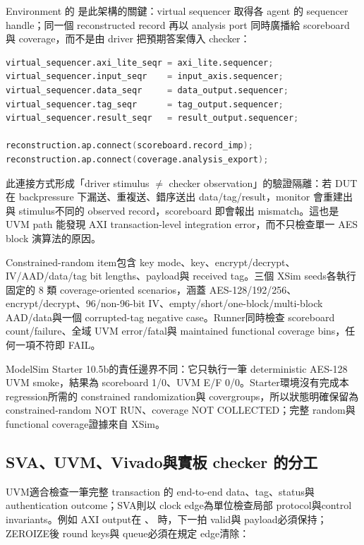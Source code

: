 \documentclass[UTF8,fontset=none,11pt,a4paper]{ctexrep}
\newcommand{\code}[1]{\texttt{\detokenize{#1}}}
\begin{document}
\newpage
Environment 的 \code{connect\_phase} 是此架構的關鍵：virtual sequencer 取得各 agent 的 sequencer handle；同一個 reconstructed record 再以 analysis port 同時廣播給 scoreboard 與 coverage，而不是由 driver 把預期答案傳入 checker：

\begin{lstlisting}[language=Verilog]
virtual_sequencer.axi_lite_seqr = axi_lite.sequencer;
virtual_sequencer.input_seqr    = input_axis.sequencer;
virtual_sequencer.data_seqr     = data_output.sequencer;
virtual_sequencer.tag_seqr      = tag_output.sequencer;
virtual_sequencer.result_seqr   = result_output.sequencer;

reconstruction.ap.connect(scoreboard.record_imp);
reconstruction.ap.connect(coverage.analysis_export);
\end{lstlisting}

此連接方式形成「driver stimulus $\neq$ checker observation」的驗證隔離：若 DUT 在 backpressure 下漏送、重複送、錯序送出 data/tag/result，monitor 會重建出與 stimulus不同的 observed record，scoreboard 即會報出 mismatch。這也是 UVM path 能發現 AXI transaction-level integration error，而不只檢查單一 AES block 演算法的原因。

Constrained-random item包含 key mode、key、encrypt/decrypt、IV/AAD/data/tag bit lengths、payload與 received tag。三個 XSim seeds各執行固定的 8 類 coverage-oriented scenarios，涵蓋 AES-128/192/256、encrypt/decrypt、96/non-96-bit IV、empty/short/one-block/multi-block AAD/data與一個 corrupted-tag negative case。Runner同時檢查 scoreboard count/failure、全域 UVM error/fatal與 maintained functional coverage bins，任何一項不符即 FAIL。

\noindent\begin{minipage}{\linewidth}
ModelSim Starter 10.5b的責任邊界不同：它只執行一筆 deterministic AES-128 UVM smoke，結果為 scoreboard 1/0、UVM E/F 0/0。Starter環境沒有完成本 regression所需的 constrained randomization與 covergroups，所以狀態明確保留為 constrained-random NOT RUN、coverage NOT COLLECTED；完整 random與 functional coverage證據來自 XSim。
\end{minipage}

\subsection{SVA、UVM、Vivado與實板 checker 的分工}

UVM適合檢查一筆完整 transaction 的 end-to-end data、tag、status與 authentication outcome；SVA則以 clock edge為單位檢查局部 protocol與control invariants。例如 AXI output在 \code{VALID=1}、\code{READY=0} 時，下一拍 valid與 payload必須保持；ZEROIZE後 round keys與 queue必須在規定 edge清除：
\end{document}
